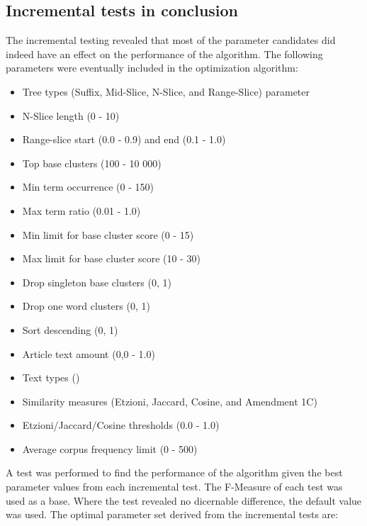 \subsection{Incremental tests in conclusion}
\label{IncrementalConclusion}
The incremental testing revealed that most of the parameter candidates did indeed have an effect on the performance of the \CTC algorithm. The following parameters were eventually included in the optimization algorithm:
\begin{itemize}
  \item Tree types (Suffix, Mid-Slice, N-Slice, and Range-Slice) parameter
  \item N-Slice length (0 - 10)
  \item Range-slice start (0.0 - 0.9) and end (0.1 - 1.0)
  \item Top base clusters (100 - 10 000)
  \item Min term occurrence (0 - 150)
  \item Max term ratio (0.01 - 1.0)
  \item Min limit for base cluster score (0 - 15)
  \item Max limit for base cluster score (10 - 30)
  \item Drop singleton base clusters (0, 1)
  \item Drop one word clusters (0, 1)
  \item Sort descending (0, 1)
  \item Article text amount (0,0 - 1.0)
  \item Text types ()
  \item Similarity measures (Etzioni, Jaccard, Cosine, and Amendment 1C)
  \item Etzioni/Jaccard/Cosine thresholds (0.0 - 1.0)
  \item Average corpus frequency limit (0 - 500)
\end{itemize}
A test was performed to find the performance of the algorithm given the best parameter values from each incremental test. The F-Measure of each test was used as a base. Where the test revealed no dicernable difference, the default value was used. The optimal parameter set derived from the incremental tests are:

